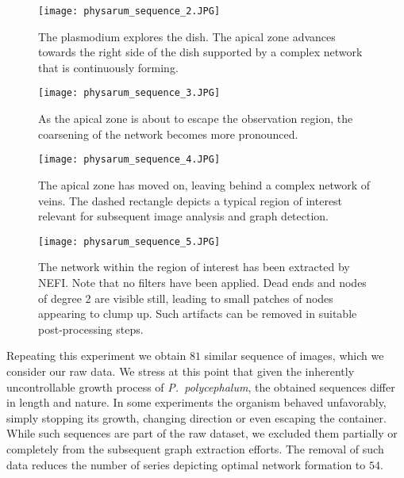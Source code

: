 	\begin{figure}
		\centering
		\texttt{[image: physarum\_sequence\_2.JPG]}
		\caption[The apical zone advances.]{The plasmodium explores the dish. The apical zone advances towards the right side of the dish supported by a complex network that is continuously forming.}
		\label{fig:sequence_2}
	\end{figure}

	\begin{figure}
		\centering
		\texttt{[image: physarum\_sequence\_3.JPG]}
		\caption[The onset of network coarsening.]{As the apical zone is about to escape the observation region, the coarsening of the network becomes more pronounced.}
		\label{fig:sequence_3}
	\end{figure}

	\begin{figure}
		\centering
		\texttt{[image: physarum\_sequence\_4.JPG]}
		\caption[A complex network of veins within a region of interest.]{The apical zone has moved on, leaving behind a complex network of veins. The dashed rectangle depicts a typical region of interest relevant for subsequent image analysis and graph detection.}
		\label{fig:sequence_4}
	\end{figure}

	\begin{figure}
		\centering
		\texttt{[image: physarum\_sequence\_5.JPG]}
		\caption[Graph extracted from the sample region of interest.]{The network within the region of interest has been extracted by NEFI. Note that no filters have been applied. Dead ends and nodes of degree 2 are visible still, leading to small patches of nodes appearing to clump up. Such artifacts can be removed in suitable post-processing steps.}
		\label{fig:sequence_5}
	\end{figure}

	Repeating this experiment we obtain $81$ similar sequence of images, which we consider our raw data. We stress at this point that given the inherently uncontrollable growth process of \emph{P.~polycephalum}, the obtained sequences differ in length and nature. In some experiments the organism behaved unfavorably, simply stopping its growth, changing direction or even escaping the container. While such sequences are part of the raw dataset, we excluded them partially or completely from the subsequent graph extraction efforts. The removal of such data reduces the number of series depicting optimal network formation to $54$.

